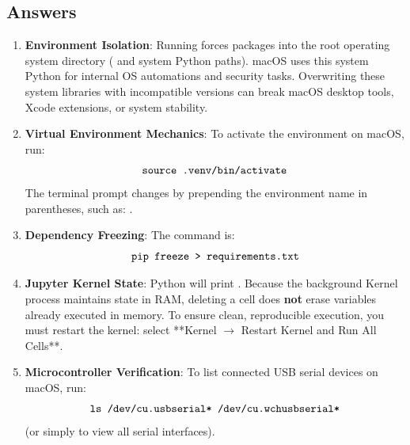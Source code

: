 \subsection*{Answers}

\begin{enumerate}
    \item \textbf{Environment Isolation}:
    Running  forces packages into the root operating system directory ( and system Python paths). macOS uses this system Python for internal OS automations and security tasks. Overwriting these system libraries with incompatible versions can break macOS desktop tools, Xcode extensions, or system stability.

    \item \textbf{Virtual Environment Mechanics}:
    To activate the environment on macOS, run:
    \begin{equation*}
    \code{source .venv/bin/activate}
    \end{equation*}
    The terminal prompt changes by prepending the environment name in parentheses, such as: .

    \item \textbf{Dependency Freezing}:
    The command is:
    \begin{equation*}
    \code{pip freeze > requirements.txt}
    \end{equation*}

    \item \textbf{Jupyter Kernel State}:
    Python will print . Because the background Kernel process maintains state in RAM, deleting a cell does \textbf{not} erase variables already executed in memory. To ensure clean, reproducible execution, you must restart the kernel: select **Kernel $\to$ Restart Kernel and Run All Cells**.

    \item \textbf{Microcontroller Verification}:
    To list connected USB serial devices on macOS, run:
    \begin{equation*}
    \code{ls /dev/cu.usbserial* /dev/cu.wchusbserial*}
    \end{equation*}
    (or simply  to view all serial interfaces).
\end{enumerate}